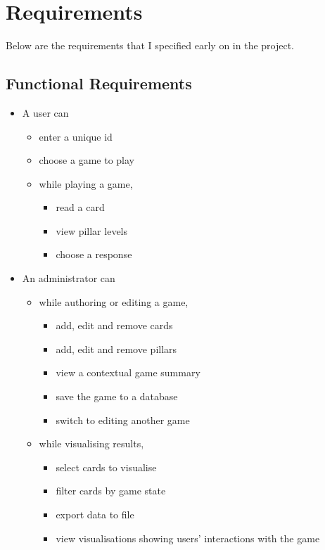 \chapter{Requirements}

Below are the requirements that I specified early on in the project.

\section{Functional Requirements}

\begin{itemize}
    \item A user can
    \begin{itemize}
        \item enter a unique id
        \item choose a game to play
        \item while playing a game,  
        \begin{itemize}
            \item read a card
            \item view pillar levels
            \item choose a response
        \end{itemize}
    \end{itemize}
    \item An administrator can
    \begin{itemize}
        \item while authoring or editing a game,
        \begin{itemize}
            \item add, edit and remove cards
            \item add, edit and remove pillars
            \item view a contextual game summary
            \item save the game to a database
            \item switch to editing another game
        \end{itemize}
        \item while visualising results,
        \begin{itemize}
            \item select cards to visualise
            \item filter cards by game state
            \item export data to file
            \item view visualisations showing users' interactions with the game
        \end{itemize}
    \end{itemize}
\end{itemize}

